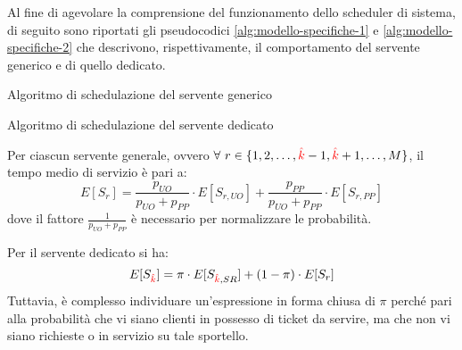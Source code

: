 Al fine di agevolare la comprensione del funzionamento dello scheduler di sistema, di seguito sono riportati gli pseudocodici \ref{alg:modello-specifiche-1} e \ref{alg:modello-specifiche-2} che descrivono, rispettivamente, il comportamento del servente generico e di quello dedicato.

\begin{algorithm}[ht]
\SetAlgoLined
{}
\caption{Algoritmo di schedulazione del servente generico}
\label{alg:modello-specifiche-1}
\end{algorithm}

\begin{algorithm}
\SetAlgoLined
{}
\caption{Algoritmo di schedulazione del servente dedicato}
\label{alg:modello-specifiche-2}
\end{algorithm}

\newpage
Per ciascun servente generale, ovvero $\forall\ r \in \lbrace 1, 2, \dots, {\color{red}\hat{k}}-1, {\color{red}\hat{k}}+1, \dots, M \rbrace$, il tempo medio di servizio è pari a:
\begin{equation}
\label{eqn:modello-specifiche-7}
E[S_r] = \frac{p_{UO}}{p_{UO} + p_{PP}} \cdot E[S_{r, UO}] +  \frac{p_{PP}}{p_{UO} + p_{PP}} \cdot E[S_{r, PP}]
\end{equation}
dove il fattore $\frac{1}{p_{UO} + p_{PP}}$ è necessario per normalizzare le probabilità.

Per il servente dedicato si ha:
\begin{equation}
\label{eqn:modello-specifiche-8}
E[S_{\color{red}\hat{k}}] = \pi \cdot E[S_{{\color{red}\hat{k}}, SR}] + (1-\pi) \cdot E[S_r]
\end{equation}
Tuttavia, è complesso individuare un'espressione in forma chiusa di $\pi$ perché pari alla probabilità che vi siano clienti in possesso di ticket \sr{} da servire, ma che non vi siano richieste \uo{} o \pp{} in servizio su tale sportello.

